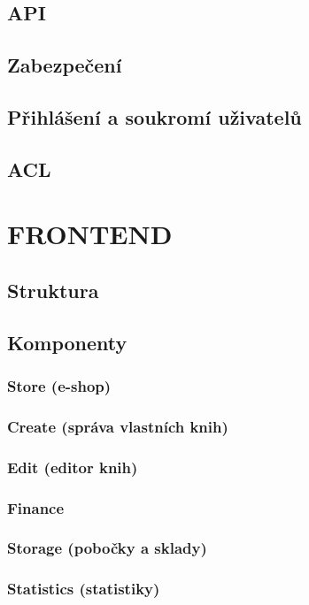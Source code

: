 \documentclass[a4paper,12pt,twoside,BCOR=10mm]{article}
\newcommand{\upc}[1]{\uppercase{#1}} %
\begin{document}
\subsection{API}
\subsection{Zabezpečení}
\subsection{Přihlášení a soukromí uživatelů}
\subsection{ACL}

\section{\upc{Frontend}}\label{sec:frontend}
\subsection{Struktura}
\subsection{Komponenty}

\subsubsection{Store (e-shop)}\label{sec:store}
\subsubsection{Create (správa vlastních knih)}\label{sec:create}
\subsubsection{Edit (editor knih)}\label{sec:edit}
\subsubsection{Finance}\label{sec:finance}
\subsubsection{Storage (pobočky a sklady)}\label{sec:storage}
\subsubsection{Statistics (statistiky)}\label{sec:stats}
\end{document}
